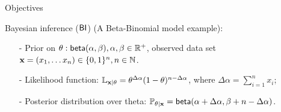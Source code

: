 \documentclass[final,hyperref={pdfpagelabels=false}]{beamer}
\begin{document}
\begin{frame}[t]
\begin{columns}[t]
\begin{column}{.485\textwidth}
\begin{block}{Objectives}

\end{block}

            
\begin{block}{Bayesian inference ($\mathsf{BI}$) (A Beta-Binomial model example):}
\begin{itemize}
  \item[-] Prior on $\theta: \mathsf{beta}(\alpha, \beta), \alpha,\beta\in\mathbb{R}^{+}$, observed data set $\textbf{x}= (x_1,\dots x_n)\in\{0,1\}^{n}, n\in\mathbb{N}$.

  \item[-] Likelihood function: $\mathbb{L}_{\textbf{x} | \theta}= \theta^{\Delta \alpha}(1-\theta)^{n - \Delta \alpha}$, where $\Delta \alpha = \displaystyle\sum_{i=1}^{n}x_i$;

  \item[-] Posterior distribution over theta: $\mathbb{P}_{\theta|\textbf{x}}=\mathsf{beta}(\alpha + \Delta \alpha,\beta + n - \Delta \alpha)$.
\end{itemize}
\end{block}



\end{column}
\end{columns}
\end{frame}
\end{document}
